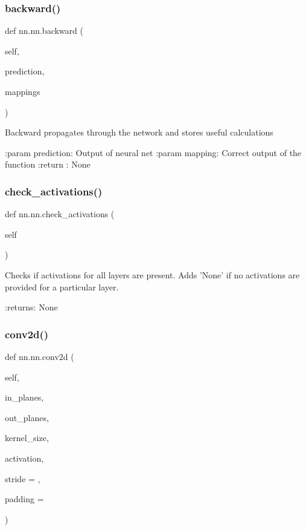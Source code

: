 \subsubsection{\texorpdfstring{backward()}{backward()}}
{\footnotesize\ttfamily def nn.\+nn.\+backward (\begin{DoxyParamCaption}\item[{}]{self,  }\item[{}]{prediction,  }\item[{}]{mappings }\end{DoxyParamCaption})}

\begin{DoxyVerb}Backward propagates through the network and stores useful calculations

:param prediction: Output of neural net
:param mapping: Correct output of the function
:return : None
\end{DoxyVerb}
 \mbox{\label{classnn_1_1nn_a15ee3f3e18ebae83c904b3441ece897d}} 
\subsubsection{\texorpdfstring{check\+\_\+activations()}{check\_activations()}}
{\footnotesize\ttfamily def nn.\+nn.\+check\+\_\+activations (\begin{DoxyParamCaption}\item[{}]{self }\end{DoxyParamCaption})}

\begin{DoxyVerb}Checks if activations for all layers are present. Adds 'None' if no activations are provided for a particular layer.

:returns: None
\end{DoxyVerb}
 \mbox{\label{classnn_1_1nn_a6d25d703f48b59a7c1888a364ab562e2}} 
\subsubsection{\texorpdfstring{conv2d()}{conv2d()}}
{\footnotesize\ttfamily def nn.\+nn.\+conv2d (\begin{DoxyParamCaption}\item[{}]{self,  }\item[{}]{in\+\_\+planes,  }\item[{}]{out\+\_\+planes,  }\item[{}]{kernel\+\_\+size,  }\item[{}]{activation,  }\item[{}]{stride = {},  }\item[{}]{padding = {} }\end{DoxyParamCaption})}

